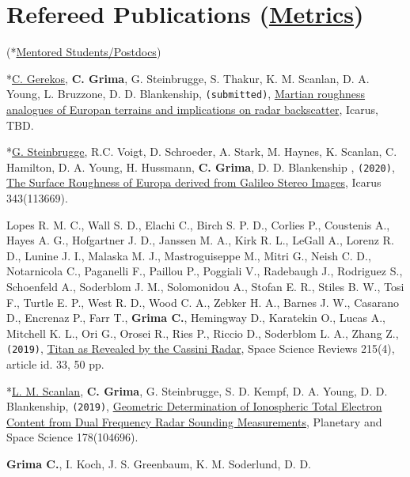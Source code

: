 \section*{Refereed Publications (\href{https://scholar.google.com/citations?user=kaUVku0AAAAJ&hl=fr}{Metrics})}

(*\underline{Mentored Students/Postdocs})

\begin{etaremune}
\def\labelenumi{\arabic{enumi}.}
\item
  *\underline{C. Gerekos}, \textbf{C. Grima}, G. Steinbrugge, S. Thakur, K. M. Scanlan, D. A. Young, L. Bruzzone, D. D. Blankenship, \texttt{(submitted)}, \href{}{Martian roughness analogues of Europan terrains and implications on radar backscatter}, Icarus, TBD.
\item
  *\underline{G. Steinbrugge}, R.C. Voigt, D. Schroeder, A. Stark, M. Haynes, K. Scanlan, C. Hamilton, D. A. Young, H. Hussmann, \textbf{C. Grima}, D. D. Blankenship , \texttt{(2020)}, \href{https://www.sciencedirect.com/science/article/abs/pii/S0019103519301526}{The Surface Roughness of Europa derived from Galileo Stereo Images}, Icarus 343(113669).
\item
  Lopes R. M. C., Wall S. D., Elachi C., Birch S. P. D., Corlies P.,
  Coustenis A., Hayes A. G., Hofgartner J. D., Janssen M. A., Kirk R.
  L., LeGall A., Lorenz R. D., Lunine J. I., Malaska M. J.,
  Mastroguiseppe M., Mitri G., Neish C. D., Notarnicola C., Paganelli
  F., Paillou P., Poggiali V., Radebaugh J., Rodriguez S., Schoenfeld
  A., Soderblom J. M., Solomonidou A., Stofan E. R., Stiles B. W., Tosi
  F., Turtle E. P., West R. D., Wood C. A., Zebker H. A., Barnes J. W.,
  Casarano D., Encrenaz P., Farr T., \textbf{Grima C.}, Hemingway D.,
  Karatekin O., Lucas A., Mitchell K. L., Ori G., Orosei R., Ries P.,
  Riccio D., Soderblom L. A., Zhang Z., \texttt{(2019)},
  \href{https://ui.adsabs.harvard.edu/abs/2019SSRv..215...33L/abstract}{Titan
  as Revealed by the Cassini Radar}, Space Science Reviews 215(4), article id. 33, 50 pp.
\item
  *\underline{L. M. Scanlan}, \textbf{C. Grima}, G. Steinbrugge, S. D.
  Kempf, D. A. Young, D. D. Blankenship, \texttt{(2019)},
  \href{https://www.sciencedirect.com/science/article/pii/S0032063319300820}{Geometric
  Determination of Ionospheric Total Electron Content from Dual
  Frequency Radar Sounding Measurements}, Planetary and Space Science 178(104696).
\item
  \textbf{Grima C.}, I. Koch, J. S. Greenbaum, K. M. Soderlund, D. D.

\end{etaremune}
